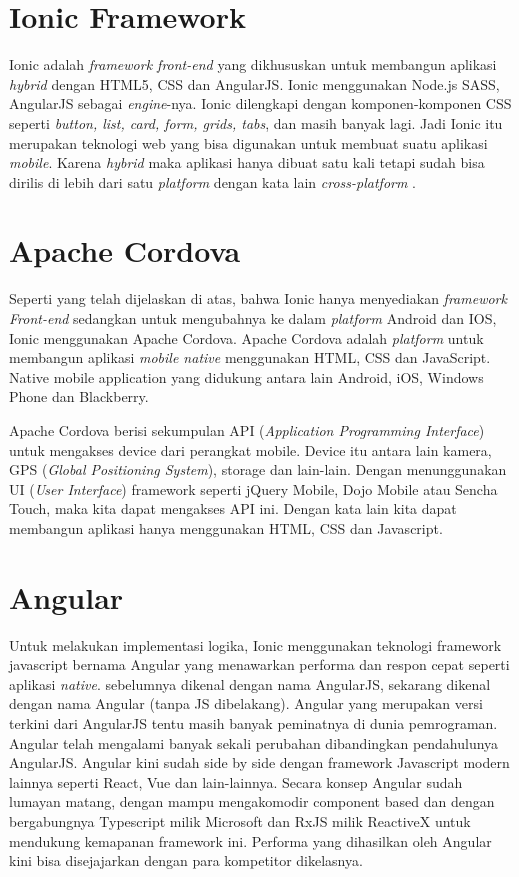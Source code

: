 \section{Ionic Framework}

Ionic adalah \textit{framework front-end} yang dikhususkan untuk membangun aplikasi \textit{hybrid} dengan HTML5, CSS dan AngularJS. Ionic menggunakan Node.js SASS, AngularJS sebagai \textit{engine}-nya. Ionic dilengkapi dengan komponen-komponen CSS seperti \textit{button, list, card, form, grids, tabs}, dan masih banyak lagi. Jadi Ionic itu merupakan teknologi web yang bisa digunakan untuk membuat suatu aplikasi \textit{mobile}. Karena \textit{hybrid} maka aplikasi hanya dibuat satu kali tetapi sudah bisa dirilis di lebih dari satu \textit{platform} dengan kata lain \textit{cross-platform} \citep{Wahyuni}.


\section{Apache Cordova}
\par Seperti yang telah dijelaskan di atas, bahwa Ionic hanya menyediakan \textit{framework Front-end} sedangkan untuk mengubahnya ke dalam \textit{platform} Android dan IOS, Ionic menggunakan Apache Cordova. Apache Cordova adalah \textit{platform} untuk membangun aplikasi \textit{mobile native} menggunakan HTML, CSS dan JavaScript. Native mobile application yang didukung antara lain Android, iOS, Windows Phone dan Blackberry.
\par Apache Cordova berisi sekumpulan API (\textit{Application Programming Interface}) untuk mengakses device dari perangkat mobile. Device itu antara lain kamera, GPS (\textit{Global Positioning System}), storage dan lain-lain.  Dengan menunggunakan UI (\textit{User Interface}) framework seperti jQuery Mobile, Dojo Mobile atau Sencha Touch, maka kita dapat mengakses API ini. Dengan kata lain kita dapat membangun aplikasi hanya menggunakan HTML, CSS dan Javascript.


\section{Angular}
\par Untuk melakukan implementasi logika, Ionic menggunakan teknologi framework javascript bernama Angular yang menawarkan performa dan respon cepat seperti aplikasi \textit{native}. sebelumnya dikenal dengan nama AngularJS, sekarang dikenal dengan nama Angular (tanpa JS dibelakang). Angular yang merupakan versi terkini dari AngularJS tentu masih banyak peminatnya di dunia pemrograman. Angular telah mengalami banyak sekali perubahan dibandingkan pendahulunya AngularJS. Angular kini sudah side by side dengan framework Javascript modern lainnya seperti React, Vue dan lain-lainnya. Secara konsep Angular sudah lumayan matang, dengan mampu mengakomodir component based dan dengan bergabungnya Typescript milik Microsoft dan RxJS milik ReactiveX untuk mendukung kemapanan framework ini. Performa yang dihasilkan oleh Angular kini bisa disejajarkan dengan para kompetitor dikelasnya.


